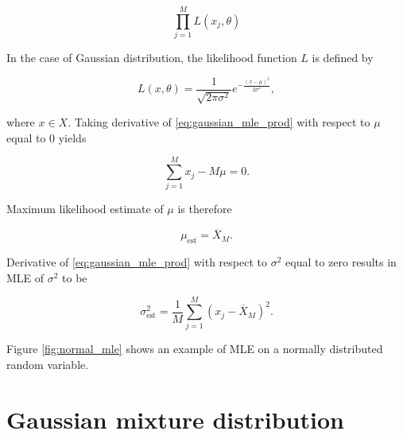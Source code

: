 \documentclass[thesis=B,english]{FITthesis}[2012/06/26]
\begin{document}
\begin{equation} \label{eq:gaussian_mle_prod}
\prod_{j=1}^{M} L(x_j, \theta)
\end{equation}

In the case of Gaussian distribution, the likelihood function $L$ is defined by

\begin{equation*}
L(x, \theta) = \frac{1}{\sqrt{2 \pi \sigma^2}}e^{-\frac{(x-\mu)^2}{2 \sigma^2}},
\end{equation*}

\medskip
where $x \in X$. Taking derivative of \ref{eq:gaussian_mle_prod} with respect to $\mu$ equal to 0 yields

\begin{equation*}
\sum_{j=1}^{M}{x_j - M \mu} = 0.
\end{equation*}

\bigskip
Maximum likelihood estimate of $\mu$ is therefore

\begin{equation*}
\mu_{\text{est}} = \overline X_M.
\end{equation*}

\medskip
Derivative of \ref{eq:gaussian_mle_prod} with respect to $\sigma^2$ equal to zero results in MLE of $\sigma^2$ to be

\begin{equation*}
\sigma^2_{\text{est}} = \frac{1}{M} \sum_{j=1}^{M} {(x_j-\overline X_M)^2}.
\end{equation*}

Figure \ref{fig:normal_mle} shows an example of MLE on a normally distributed random variable.

\section{Gaussian mixture distribution}
\end{document}
